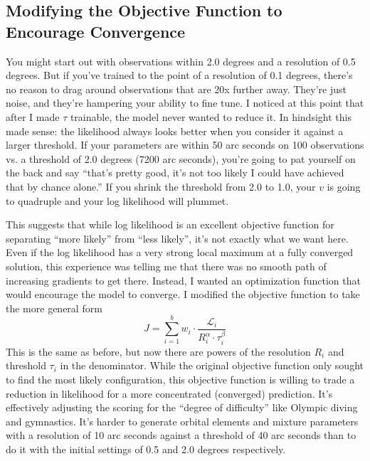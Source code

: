 \subsection{Modifying the Objective Function to Encourage Convergence}
You might start out with observations within 2.0 degrees and a resolution of 0.5 degrees.
But if you've trained to the point of a resolution of 0.1 degrees, there's no reason to drag around observations that are 20x further away.
They're just noise, and they're hampering your ability to fine tune.
I noticed at this point that after I made $\tau$ trainable, the model never wanted to reduce it.
In hindsight this made sense: the likelihood always looks better when you consider it against a larger threshold.
If your parameters are within 50 arc seconds on 100 observations vs. a threshold of 2.0 degrees (7200 arc seconds), 
you're going to pat yourself on the back and say ``that's pretty good, it's not too likely I could have achieved that by chance alone.''
If you shrink the threshold from 2.0 to 1.0, your $v$ is going to quadruple and your log likelihood will plummet.

This suggests that while log likelihood is an excellent objective function for separating ``more likely'' from ``less likely'', it's not exactly what we want here.
Even if the log likelihood has a very strong local maximum at a fully converged solution,
this experience was telling me that there was no smooth path of increasing gradients to get there.
Instead, I wanted an optimization function that would encourage the model to converge.
I modified the objective function to take the more general form
$$J = \sum_{i=1}^{b} w_i \cdot \frac{\mathcal{L}_i}{R_i^\alpha \cdot \tau_i^\beta}$$
This is the same as before, but now there are powers of the resolution $R_i$ and threshold $\tau_i$ in the denominator.
While the original objective function only sought to find the most likely configuration,
this objective function is willing to trade a reduction in likelihood for a more concentrated (converged) prediction.
It's effectively adjusting the scoring for the ``degree of difficulty'' like Olympic diving and gymnastics.
It's harder to generate orbital elements and mixture parameters with a resolution of 10 arc seconds against a threshold of 40 arc seconds
than to do it with the initial settings of 0.5 and 2.0 degrees respectively.

